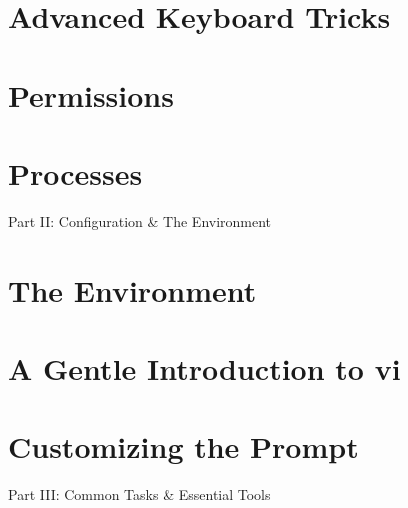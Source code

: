\documentclass[oneside]{book}
\numberwithin{equation}{section}
\begin{document}
\section{Advanced Keyboard Tricks}


\section{Permissions}


\section{Processes}


\begin{center}
	\huge Part II: Configuration \& The Environment
\end{center}

\section{The Environment}


\section{A Gentle Introduction to vi}


\section{Customizing the Prompt}


\begin{center}
	\huge Part III: Common Tasks \& Essential Tools
\end{center}

\end{document}
